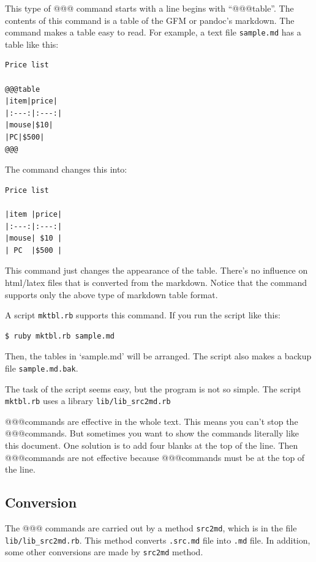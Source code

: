 This type of @@@ command starts with a line begins with ``@@@table''.
The contents of this command is a table of the GFM or pandoc's markdown.
The command makes a table easy to read. For example, a text file
\texttt{sample.md} has a table like this:

\begin{verbatim}
Price list

@@@table
|item|price|
|:---:|:---:|
|mouse|$10|
|PC|$500|
@@@
\end{verbatim}

The command changes this into:

\begin{verbatim}
Price list

|item |price|
|:---:|:---:|
|mouse| $10 |
| PC  |$500 |
\end{verbatim}

This command just changes the appearance of the table. There's no
influence on html/latex files that is converted from the markdown.
Notice that the command supports only the above type of markdown table
format.

A script \texttt{mktbl.rb} supports this command. If you run the script
like this:

\begin{verbatim}
$ ruby mktbl.rb sample.md
\end{verbatim}

Then, the tables in `sample.md' will be arranged. The script also makes
a backup file \texttt{sample.md.bak}.

The task of the script seems easy, but the program is not so simple. The
script \texttt{mktbl.rb} uses a library \texttt{lib/lib\_src2md.rb}

@@@commands are effective in the whole text. This means you can't stop
the @@@commands. But sometimes you want to show the commands literally
like this document. One solution is to add four blanks at the top of the
line. Then @@@commands are not effective because @@@commands must be at
the top of the line.

\subsection{Conversion}\label{conversion}

The @@@ commands are carried out by a method \texttt{src2md}, which is
in the file \texttt{lib/lib\_src2md.rb}. This method converts
\texttt{.src.md} file into \texttt{.md} file. In addition, some other
conversions are made by \texttt{src2md} method.

